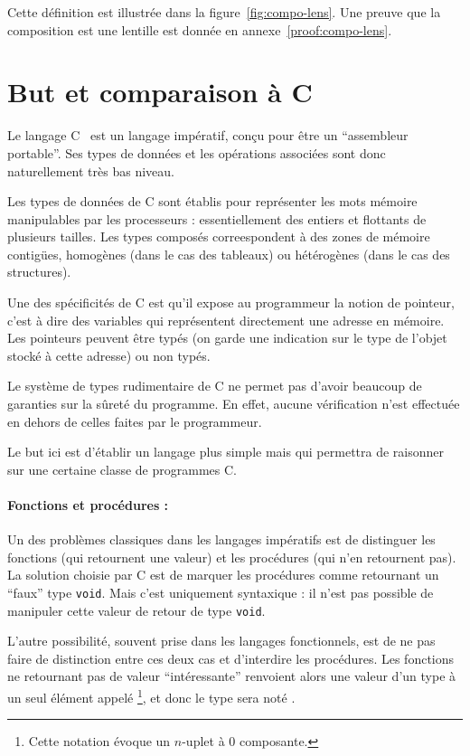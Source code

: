 Cette définition est illustrée dans la figure~\ref{fig:compo-lens}. Une preuve
que la composition est une lentille est donnée en annexe~\ref{proof:compo-lens}.

\section{But et comparaison à C}

Le langage C~\cite{KandR} est un langage impératif, conçu pour être un
``assembleur portable''. Ses types de données et les opérations associées sont
donc naturellement très bas niveau.

Les types de données de C sont établis pour représenter les mots mémoire
manipulables par les processeurs : essentiellement des entiers et flottants de
plusieurs tailles. Les types composés correespondent à des zones de mémoire
contigües, homogènes (dans le cas des tableaux) ou hétérogènes (dans le cas des
structures).

Une des spécificités de C est qu'il expose au programmeur la notion de pointeur,
c'est à dire des variables qui représentent directement une adresse en mémoire.
Les pointeurs peuvent être typés (on garde une indication sur le type de l'objet
stocké à cette adresse) ou non typés.

Le système de types rudimentaire de C ne permet pas d'avoir beaucoup de
garanties sur la sûreté du programme. En effet, aucune vérification n'est
effectuée en dehors de celles faites par le programmeur.

Le but ici est d'établir un langage plus simple mais qui permettra de raisonner
sur une certaine classe de programmes C.


\paragraph{Fonctions et procédures :} Un des problèmes classiques dans les
langages impératifs est de distinguer les fonctions (qui retournent une valeur)
et les procédures (qui n'en retournent pas). La solution choisie par C est de
marquer les procédures comme retournant un ``faux'' type \texttt{void}. Mais
c'est uniquement syntaxique : il n'est pas possible de manipuler cette valeur de
retour de type \texttt{void}.

L'autre possibilité, souvent prise dans les langages fonctionnels, est de ne pas
faire de distinction entre ces deux cas et d'interdire les procédures. Les
fonctions ne retournant pas de valeur ``intéressante'' renvoient alors une
valeur d'un type à un seul élément appelé \eUnit\footnote{Cette notation évoque
un $n$-uplet à 0 composante.}, et donc le type sera noté \tUnit.

